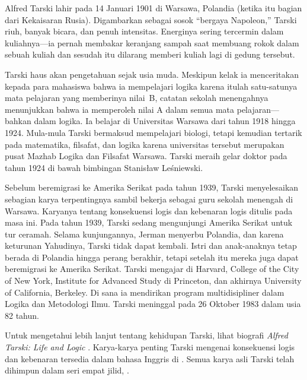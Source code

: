 \documentclass[../../../include/open-logic-section]{subfiles}
\begin{document}



Alfred Tarski lahir pada 14 Januari 1901 di Warsawa, Polandia (ketika itu
bagian dari Kekaisaran Rusia). Digambarkan sebagai sosok ``bergaya
Napoleon,'' Tarski riuh, banyak bicara, dan penuh intensitas. Energinya
sering tercermin dalam kuliahnya---ia pernah membakar keranjang sampah saat
membuang rokok dalam sebuah kuliah dan sesudah itu dilarang memberi kuliah
lagi di gedung tersebut.

Tarski haus akan pengetahuan sejak usia muda. Meskipun kelak ia menceritakan
kepada para mahasiswa bahwa ia mempelajari logika karena itulah satu-satunya
mata pelajaran yang memberinya nilai~B, catatan sekolah menengahnya
menunjukkan bahwa ia memperoleh nilai A dalam semua mata pelajaran---bahkan
dalam logika. Ia belajar di Universitas Warsawa dari tahun 1918 hingga 1924.
Mula-mula Tarski bermaksud mempelajari biologi, tetapi kemudian tertarik pada
matematika, filsafat, dan logika karena universitas tersebut merupakan pusat
Mazhab Logika dan Filsafat Warsawa. Tarski meraih gelar doktor pada tahun
1924 di bawah bimbingan Stanis\l{}aw Le\'{s}niewski.

Sebelum beremigrasi ke Amerika Serikat pada tahun 1939, Tarski menyelesaikan
sebagian karya terpentingnya sambil bekerja sebagai guru sekolah menengah di
Warsawa. Karyanya tentang konsekuensi logis dan kebenaran logis ditulis pada
masa ini. Pada tahun 1939, Tarski sedang mengunjungi Amerika Serikat untuk
tur ceramah. Selama kunjungannya, Jerman menyerbu Polandia, dan karena
keturunan Yahudinya, Tarski tidak dapat kembali. Istri dan anak-anaknya tetap
berada di Polandia hingga perang berakhir, tetapi setelah itu mereka juga
dapat beremigrasi ke Amerika Serikat. Tarski mengajar di Harvard, College of
the City of New York, Institute for Advanced Study di Princeton, dan
akhirnya University of California, Berkeley. Di sana ia mendirikan program
multidisipliner dalam Logika dan Metodologi Ilmu. Tarski meninggal pada 26
Oktober 1983 dalam usia 82 tahun.

\begin{reading}
Untuk mengetahui lebih lanjut tentang kehidupan Tarski, lihat biografi
\emph{Alfred Tarski: Life and Logic} \citep{Feferman2004}. Karya-karya
penting Tarski mengenai konsekuensi logis dan kebenaran tersedia dalam
bahasa Inggris di \citep{Tarski1983}. Semua karya asli Tarski telah dihimpun
dalam seri empat jilid, \citep{Tarski1981}.
\end{reading}
\end{document}
